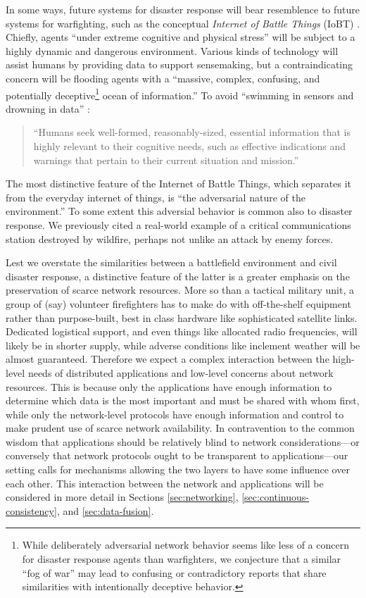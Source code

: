 \documentclass[]             %
{NASA}                       %
\theoremstyle{definition}
\begin{document}
In some ways, future systems for disaster response will bear
resemblence to future systems for warfighting, such as the conceptual
\emph{Internet of Battle Things} (IoBT) \cite{2016:iobt}. Chiefly,
agents ``under extreme cognitive and physical stress'' will be subject
to a highly dynamic and dangerous environment. Various kinds of
technology will assist humans by providing data to support
sensemaking, but a contraindicating concern will be flooding agents with a
``massive, complex, confusing, and potentially
deceptive\footnote{While deliberately adversarial network behavior
seems like less of a concern for disaster response agents than
warfighters, we conjecture that a similar ``fog of war'' may
lead to confusing or contradictory reports that share similarities
with intentionally deceptive behavior.} ocean of information.'' To
avoid ``swimming in sensors and drowning in data''
\cite{2010:magnuson}:
\begin{quote}
``Humans seek well-formed, reasonably-sized, essential information
  that is highly relevant to their cognitive needs, such as effective
  indications and warnings that pertain to their current situation and
  mission.'' \cite{2016:iobt}
\end{quote}
The most distinctive feature of the Internet of Battle Things, which
separates it from the everyday internet of things, is ``the
adversarial nature of the environment.'' To some extent this adversial
behavior is common also to disaster response. We previously cited a
real-world example of a critical communications station destroyed by
wildfire, perhaps not unlike an attack by enemy forces.

Lest we overstate the similarities between a battlefield environment
and civil disaster response, a distinctive feature of the latter is a
greater emphasis on the preservation of scarce network resources. More
so than a tactical military unit, a group of (say) volunteer
firefighters has to make do with off-the-shelf equipment rather than
purpose-built, best in class hardware like sophisticated satellite
links. Dedicated logistical support, and even things like allocated
radio frequencies, will likely be in shorter supply, while adverse
conditions like inclement weather will be almost guaranteed. Therefore
we expect a complex interaction between the high-level needs of
distributed applications and low-level concerns about network
resources. This is because only the applications have enough
information to determine which data is the most important and must be
shared with whom first, while only the network-level protocols have
enough information and control to make prudent use of scarce network
availability. In contravention to the common wisdom that applications
should be relatively blind to network considerations---or conversely
that network protocols ought to be transparent to applications---our
setting calls for mechanisms allowing the two layers to have some
influence over each other. This interaction between the network and
applications will be considered in more detail in Sections
\ref{sec:networking}, \ref{sec:continuous-consistency}, and
\ref{sec:data-fusion}.
\end{document}
